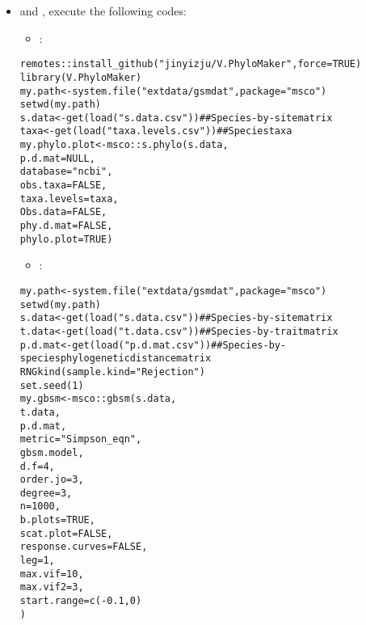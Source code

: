 \documentclass[a4paper]{book}
\begin{document}
\begin{Value}
\begin{itemize}
\begin{alltt}
\end{alltt}

\item{}  and , execute the following codes:
\begin{itemize}

\item{} :

\end{itemize}
\begin{alltt}  remotes::install_github("jinyizju/V.PhyloMaker", force = TRUE)
  library(V.PhyloMaker)
  my.path <- system.file("extdata/gsmdat", package = "msco")
  setwd(my.path)
  s.data <- get(load("s.data.csv")) ##Species-by-site matrix
  taxa <- get(load("taxa.levels.csv")) ##Species taxa
  my.phylo.plot <- msco::s.phylo(s.data,
                            p.d.mat = NULL,
                            database = "ncbi",
                            obs.taxa = FALSE,
                            taxa.levels = taxa,
                            Obs.data = FALSE,
                            phy.d.mat = FALSE,
                            phylo.plot = TRUE)

\end{alltt}

\begin{itemize}

\item{} :

\end{itemize}
\begin{alltt}  my.path <- system.file("extdata/gsmdat", package = "msco")
  setwd(my.path)
  s.data <- get(load("s.data.csv")) ##Species-by-site matrix
  t.data <- get(load("t.data.csv")) ##Species-by-trait matrix
  p.d.mat <- get(load("p.d.mat.csv")) ##Species-by-species phylogenetic distance matrix
  RNGkind(sample.kind = "Rejection")
  set.seed(1)
  my.gbsm <- msco::gbsm(s.data,
                    t.data,
                    p.d.mat,
                    metric = "Simpson_eqn",
                    gbsm.model,
                    d.f = 4,
                    order.jo = 3,
                    degree = 3,
                    n = 1000,
                    b.plots = TRUE,
                    scat.plot = FALSE,
                    response.curves = FALSE,
                    leg = 1,
                    max.vif = 10,
                    max.vif2 = 3,
                    start.range=c(-0.1,0)
                  )

\end{alltt}


\end{itemize}
\end{Value}
\end{document}
